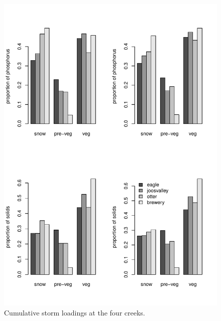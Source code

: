 \documentclass[12pt]{article}
\begin{document}
\begin{figure}[h!]
    \begin{center}
\includegraphics{loadings-fig2}
    \end{center}
    \vspace{-10mm}
    \caption{Cumulative storm loadings at the four creeks.\label{bars}}
\end{figure}
\end{document}
